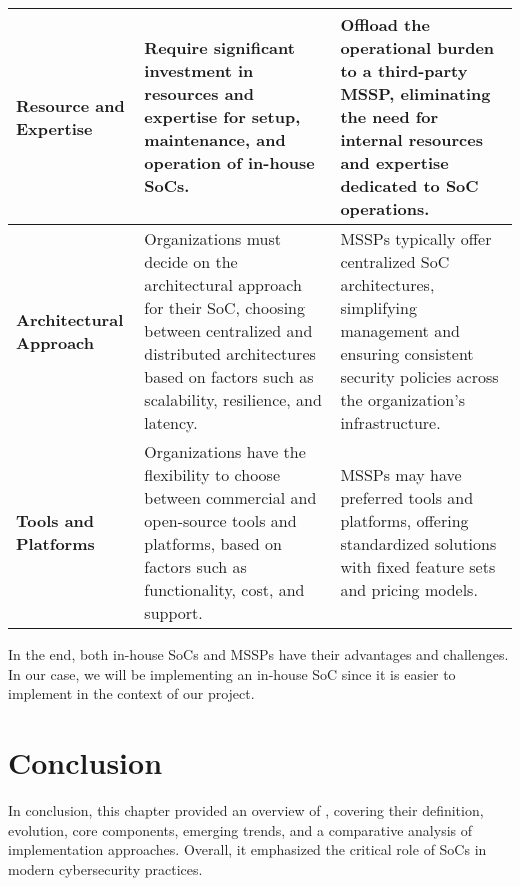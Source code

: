 \begin{longtable}{|p{}|p{}|p{}|}
    \hline
    \textbf{Resource and Expertise}    & Require significant investment in resources and expertise for setup, maintenance, and operation of in-house SoCs.                                                                                & Offload the operational burden to a third-party MSSP, eliminating the need for internal resources and expertise dedicated to SoC operations.                    \\
    \hline
    \textbf{Architectural Approach}    & Organizations must decide on the architectural approach for their SoC, choosing between centralized and distributed architectures based on factors such as scalability, resilience, and latency. & MSSPs typically offer centralized SoC architectures, simplifying management and ensuring consistent security policies across the organization's infrastructure. \\
    \hline
    \textbf{Tools and Platforms}       & Organizations have the flexibility to choose between commercial and open-source tools and platforms, based on factors such as functionality, cost, and support.                                  & MSSPs may have preferred tools and platforms, offering standardized solutions with fixed feature sets and pricing models.                                       \\
    \hline
\end{longtable}

In the end, both in-house SoCs and MSSPs have their advantages and challenges.
In our case, we will be implementing an in-house SoC since it is easier to implement in the context of our project.

\setcounter{secnumdepth}{0} %
\section{Conclusion}
In conclusion, this chapter provided an overview of , covering their definition, evolution, core components, emerging trends, and a comparative analysis of implementation approaches. Overall, it emphasized the critical role of SoCs in modern cybersecurity practices.

